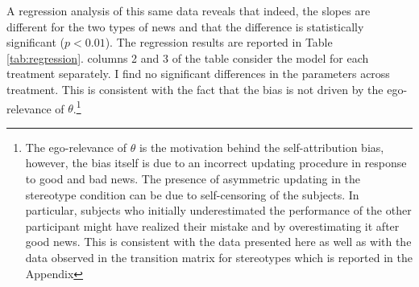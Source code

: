 \documentclass[
  12pt,
]{article}
\begin{document}
A regression analysis of this same data reveals that indeed, the slopes
are different for the two types of news and that the difference is
statistically significant (\(p<0.01\)). The regression results are
reported in Table \ref{tab:regression}. columns 2 and 3 of the table
consider the model for each treatment separately. I find no significant
differences in the parameters across treatment. This is consistent with
the fact that the bias is not driven by the ego-relevance of
\(\theta\).\footnote{The ego-relevance of $\theta$ is the motivation behind the self-attribution bias, 
however, the bias itself is due to an incorrect updating procedure in response to good and bad news. The presence of 
asymmetric updating in the stereotype condition can be due to self-censoring of the subjects. In particular, subjects 
who initially underestimated the performance of the other participant might have realized their mistake and 
by overestimating it after good news. This is consistent with the data presented here as well as with 
the data observed in the transition matrix for stereotypes which is reported in the Appendix}
\end{document}
